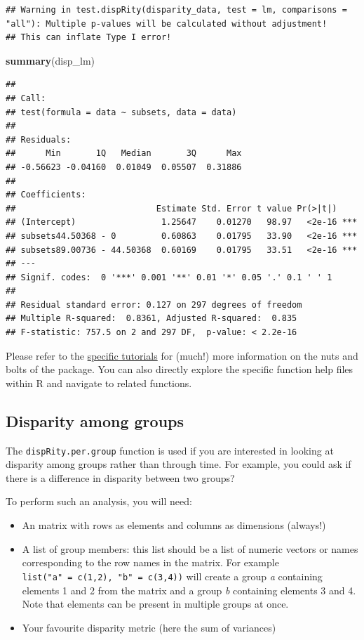 \documentclass[]{book}
\newenvironment{Shaded}{\begin{snugshade}}{\end{snugshade}}
\newcommand{\KeywordTok}[1]{\textcolor[rgb]{0.13,0.29,0.53}{\textbf{#1}}}
\newcommand{\NormalTok}[1]{#1}
\providecommand{\tightlist}{%
  \setlength{\itemsep}{0pt}\setlength{\parskip}{0pt}}
\theoremstyle{definition}
\theoremstyle{definition}
\theoremstyle{definition}
\theoremstyle{remark}
\begin{document}
\begin{verbatim}
## Warning in test.dispRity(disparity_data, test = lm, comparisons = "all"): Multiple p-values will be calculated without adjustment!
## This can inflate Type I error!
\end{verbatim}

\begin{Shaded}
\begin{Highlighting}[]
\KeywordTok{summary}\NormalTok{(disp_lm)}
\end{Highlighting}
\end{Shaded}

\begin{verbatim}
## 
## Call:
## test(formula = data ~ subsets, data = data)
## 
## Residuals:
##      Min       1Q   Median       3Q      Max 
## -0.56623 -0.04160  0.01049  0.05507  0.31886 
## 
## Coefficients:
##                            Estimate Std. Error t value Pr(>|t|)    
## (Intercept)                 1.25647    0.01270   98.97   <2e-16 ***
## subsets44.50368 - 0         0.60863    0.01795   33.90   <2e-16 ***
## subsets89.00736 - 44.50368  0.60169    0.01795   33.51   <2e-16 ***
## ---
## Signif. codes:  0 '***' 0.001 '**' 0.01 '*' 0.05 '.' 0.1 ' ' 1
## 
## Residual standard error: 0.127 on 297 degrees of freedom
## Multiple R-squared:  0.8361, Adjusted R-squared:  0.835 
## F-statistic: 757.5 on 2 and 297 DF,  p-value: < 2.2e-16
\end{verbatim}

Please refer to the \protect\hyperlink{specific-tutorial}{specific
tutorials} for (much!) more information on the nuts and bolts of the
package. You can also directly explore the specific function help files
within R and navigate to related functions.

\hypertarget{disparity-among-groups}{\subsection{Disparity among
groups}\label{disparity-among-groups}}

The \texttt{dispRity.per.group} function is used if you are interested
in looking at disparity among groups rather than through time. For
example, you could ask if there is a difference in disparity between two
groups?

To perform such an analysis, you will need:

\begin{itemize}
\tightlist
\item
  An matrix with rows as elements and columns as dimensions (always!)
\item
  A list of group members: this list should be a list of numeric vectors
  or names corresponding to the row names in the matrix. For example
  \texttt{list("a"\ =\ c(1,2),\ "b"\ =\ c(3,4))} will create a group
  \emph{a} containing elements 1 and 2 from the matrix and a group
  \emph{b} containing elements 3 and 4. Note that elements can be
  present in multiple groups at once.
\item
  Your favourite disparity metric (here the sum of variances)
\end{itemize}
\end{document}
